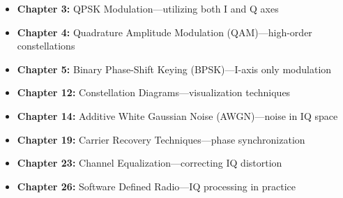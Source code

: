\begin{itemize}
\item \textbf{Chapter 3:} QPSK Modulation---utilizing both I and Q axes
\item \textbf{Chapter 4:} Quadrature Amplitude Modulation (QAM)---high-order constellations
\item \textbf{Chapter 5:} Binary Phase-Shift Keying (BPSK)---I-axis only modulation
\item \textbf{Chapter 12:} Constellation Diagrams---visualization techniques
\item \textbf{Chapter 14:} Additive White Gaussian Noise (AWGN)---noise in IQ space
\item \textbf{Chapter 19:} Carrier Recovery Techniques---phase synchronization
\item \textbf{Chapter 23:} Channel Equalization---correcting IQ distortion
\item \textbf{Chapter 26:} Software Defined Radio---IQ processing in practice
\end{itemize}
